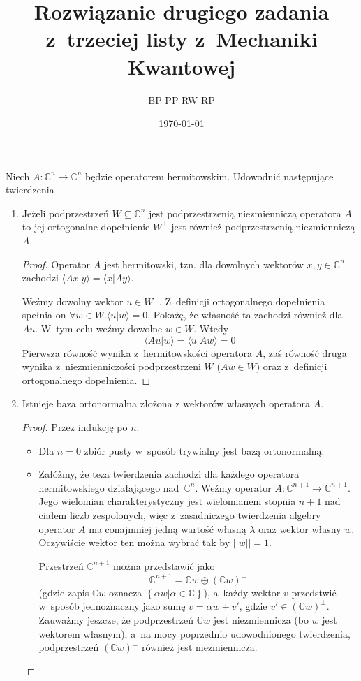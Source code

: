 \documentclass{article}
\title{Rozwiązanie drugiego zadania z~trzeciej listy z~Mechaniki Kwantowej}
\author{BP PP RW RP}
\date{\today}
\begin{document}
\maketitle

Niech $A\colon\mathbb{C}^n\to \mathbb{C}^n$
będzie operatorem hermitowskim. Udowodnić następujące twierdzenia
\begin{enumerate}
\item
Jeżeli podprzestrzeń $W\subseteq \mathbb{C}^n$ jest podprzestrzenią
niezmienniczą operatora $A$ to jej ortogonalne dopełnienie
$W^\perp$ jest również podprzestrzenią niezmienniczą $A$.

\begin{proof}
Operator $A$ jest hermitowski, tzn. dla dowolnych wektorów 
$x,y\in\mathbb{C}^n$ zachodzi 
\mbox{$\langle{}Ax|y\rangle=\langle{}x|Ay\rangle$}.

Weźmy dowolny wektor $u\in W^\perp$. Z~definicji ortogonalnego dopełnienia 
spełnia on $\forall w\in W.\langle{}u|w\rangle=0$. Pokażę, że własność ta 
zachodzi również dla $Au$. W~tym celu weźmy dowolne $w\in W$. Wtedy
\[
\langle{}Au|w\rangle = \langle{}u|Aw\rangle = 0
\]
Pierwsza równość wynika z~hermitowskości operatora $A$, zaś równość 
druga wynika z~niezmienniczości podprzestrzeni $W$ ($Aw \in W$) oraz 
z~definicji ortogonalnego dopełnienia.
\end{proof}

\item
Istnieje baza ortonormalna złożona z wektorów własnych operatora $A$.

\begin{proof}
Przez indukcję po $n$.
\begin{itemize}
\item Dla $n=0$ zbiór pusty w~sposób trywialny jest bazą ortonormalną.
\item Załóżmy, że teza twierdzenia zachodzi dla każdego operatora 
hermitowskiego działającego nad~$\mathbb{C}^n$. 
Weźmy operator $A\colon\mathbb{C}^{n+1}\to\mathbb{C}^{n+1}$.
Jego wielomian charakterystyczny jest wielomianem stopnia $n+1$ nad
ciałem liczb zespolonych, więc z~zasadniczego twierdzenia algebry
operator $A$ ma conajmniej jedną wartość własną $\lambda$ oraz wektor 
własny $w$. Oczywiście wektor ten można wybrać tak by $||w||=1$.

Przestrzeń $\mathbb{C}^{n+1}$ można przedstawić jako
\[
\mathbb{C}^{n+1} = \mathbb{C}w \oplus \left(\mathbb{C}w\right)^\perp
\]
(gdzie zapis $\mathbb{C}w$ oznacza 
$\left\{\alpha{}w | \alpha\in\mathbb{C}\right\}$), a~każdy wektor $v$
przedstwić w~sposób jednoznaczny jako sumę $v=\alpha{}w+v'$, gdzie 
$v'\in \left(\mathbb{C}w\right)^\perp$. Zauważmy jeszcze, że podprzestrzeń
$\mathbb{C}w$ jest niezmiennicza (bo $w$ jest wektorem własnym), a~na
mocy poprzednio udowodnionego twierdzenia, podprzestrzeń 
$\left(\mathbb{C}w\right)^\perp$ również jest niezmiennicza.


\end{itemize}
\end{proof}
\end{enumerate}
\end{document}
